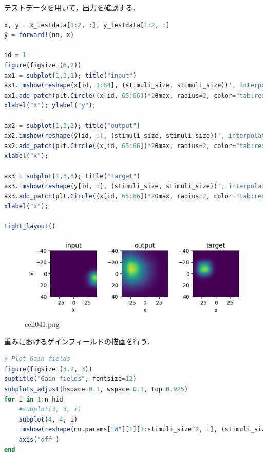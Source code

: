テストデータを用いて，出力を確認する．
\begin{lstlisting}[language=julia]
x, y = x_testdata[1:2, :], y_testdata[1:2, :]
ŷ = forward!(nn, x)

id = 1
figure(figsize=(6,2))
ax1 = subplot(1,3,1); title("input")
ax1.imshow(reshape(x[id, 1:64], (stimuli_size, stimuli_size))', interpolation="gaussian", extent=[-θmax, θmax, θmax, -θmax])
ax1.add_patch(plt.Circle((x[id, 65:66])*2θmax, radius=2, color="tab:red", fill=false))
xlabel("x"); ylabel("y");

ax2 = subplot(1,3,2); title("output")
ax2.imshow(reshape(ŷ[id, :], (stimuli_size, stimuli_size))', interpolation="gaussian", extent=[-θmax, θmax, θmax, -θmax])
ax2.add_patch(plt.Circle((x[id, 65:66])*2θmax, radius=2, color="tab:red", fill=false))
xlabel("x");

ax3 = subplot(1,3,3); title("target")
ax3.imshow(reshape(y[id, :], (stimuli_size, stimuli_size))', interpolation="gaussian", extent=[-θmax, θmax, θmax, -θmax])
ax3.add_patch(plt.Circle((x[id, 65:66])*2θmax, radius=2, color="tab:red", fill=false))
xlabel("x");

tight_layout()
\end{lstlisting}
\begin{figure}[ht]
	\centering
	\includegraphics[scale=0.8, max width=\linewidth]{./fig/solve-credit-assignment-problem/backpropagation/cell041.png}
	\caption{cell041.png}
	\label{cell041.png}
\end{figure}
重みにおけるゲインフィールドの描画を行う．
\begin{lstlisting}[language=julia]
# Plot Gain fields
figure(figsize=(3.2, 3))
suptitle("Gain fields", fontsize=12)
subplots_adjust(hspace=0.1, wspace=0.1, top=0.925)
for i in 1:n_hid
    #subplot(3, 3, i)
    subplot(4, 4, i)
    imshow(reshape(nn.params["W"][1][1:stimuli_size^2, i], (stimuli_size, stimuli_size)), cmap="hot")
    axis("off")
end
\end{lstlisting}
